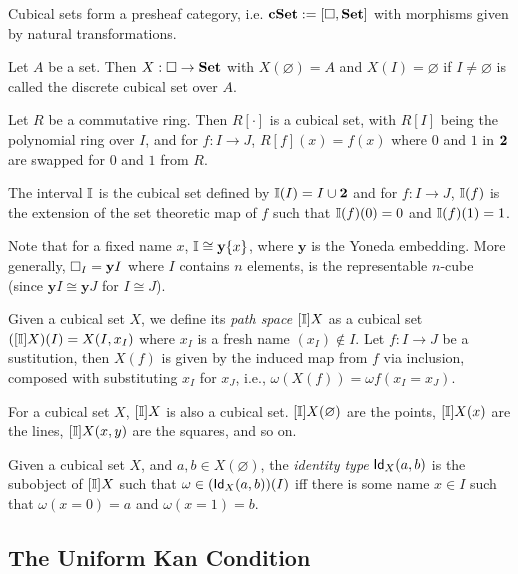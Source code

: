 Cubical sets form a presheaf category, i.e. $\mathbf{cSet} := [\square, \mathbf{Set}]$ with morphisms given by 
natural transformations.
\begin{example}
  Let $A$ be a set. Then $X : \mathbf{\square} \to \mathbf{Set}$ with $X(\varnothing) = A$ and $X(I) = \varnothing$ if $I \neq \varnothing$
  is called the discrete cubical set over $A$.
\end{example}
\begin{example}
  Let $R$ be a commutative ring. Then $R[\cdot]$ is a cubical set, with $R[I]$ being the polynomial ring over $I$,
  and for $f : I \to J$, $R[f](x) = f(x)$ where $0$ and $1$ in $\mathbf{2}$ are swapped for $0$ and $1$ from $R$. 
\end{example}

\begin{example}[Interval] 
  The interval $\mathbb{I}$ is the cubical set defined by $\mathbb{I}(I) = I \cup \mathbf{2}$ and for $f : I \to J$,
  $\mathbb{I}(f)$ is the extension of the set theoretic map of $f$ such that $\mathbb{I}(f)(0) = 0$
  and $\mathbb{I}(f)(1) = 1$.
\end{example}

Note that for a fixed name $x$, $\mathbb{I} \cong \mathbf{y}\{x\}$, where $\mathbf{y}$ is the Yoneda embedding.
More generally, $\mathbf{\square}_I = \mathbf{y}I$ where $I$ contains $n$ elements, is the representable $n$-cube (since $\mathbf{y}I \cong \mathbf{y}J$ for $I \cong J$).

\begin{definition}  
  Given a cubical set $X$, we define its \emph{path space} $[\mathbb{I}]X$ as a cubical set $([\mathbb{I}]X)(I) = X(I,x_I)$ where $x_I$ is a fresh name $(x_I) \notin I$.
  Let $f : I \to J$ be a sustitution, then $X(f)$ is given by the induced map from $f$ via inclusion, composed with substituting $x_I$ for $x_J$, i.e.,
  $\omega (X(f))= \omega f(x_I = x_J)$.
\end{definition}
For a cubical set $X$, $[\mathbb{I}]X$ is also a cubical set. $[\mathbb{I}]X(\varnothing)$ are the points, $[\mathbb{I}]X(x)$ are the lines, $[\mathbb{I}]X(x,y)$ are the squares,
and so on.

\begin{definition}
  Given a cubical set $X$, and $a, b \in X(\varnothing)$, the \emph{identity type} $\mathsf{Id}_X(a,b)$ is the subobject of $[\mathbb{I}]X$ such that
  $\omega \in (\mathsf{Id}_X(a,b))(I)$ iff there is some name $x \in I$ such that $\omega(x =  0) = a$ and $\omega(x = 1) = b$. 
\end{definition}

\subsection{The Uniform Kan Condition}

